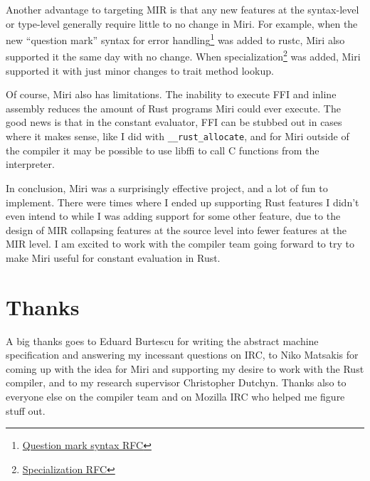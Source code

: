 \documentclass[twocolumn]{article}
\newcommand{\rust}[1]{\texttt{#1}}
\begin{document}
Another advantage to targeting MIR is that any new features at the syntax-level or type-level
generally require little to no change in Miri. For example, when the new ``question mark'' syntax
for error handling\footnote{
  \href{https://github.com/rust-lang/rfcs/blob/master/text/0243-trait-based-exception-handling.md}
    {Question mark syntax RFC}}
was added to rustc, Miri also supported it the same day with no change. When specialization\footnote{
  \href{https://github.com/rust-lang/rfcs/blob/master/text/1210-impl-specialization.md}
    {Specialization RFC}}
was added, Miri supported it with just minor changes to trait method lookup.

Of course, Miri also has limitations. The inability to execute FFI and inline assembly reduces the
amount of Rust programs Miri could ever execute. The good news is that in the constant evaluator,
FFI can be stubbed out in cases where it makes sense, like I did with \rust{__rust_allocate}, and
for Miri outside of the compiler it may be possible to use libffi to call C functions from the
interpreter.

In conclusion, Miri was a surprisingly effective project, and a lot of fun to implement. There were
times where I ended up supporting Rust features I didn't even intend to while I was adding support
for some other feature, due to the design of MIR collapsing features at the source level into fewer
features at the MIR level. I am excited to work with the compiler team going forward to try to make
Miri useful for constant evaluation in Rust.


\section{Thanks}

A big thanks goes to Eduard Burtescu for writing the abstract machine specification and answering my
incessant questions on IRC, to Niko Matsakis for coming up with the idea for Miri and supporting my
desire to work with the Rust compiler, and to my research supervisor Christopher Dutchyn. Thanks
also to everyone else on the compiler team and on Mozilla IRC who helped me figure stuff out.
\end{document}
